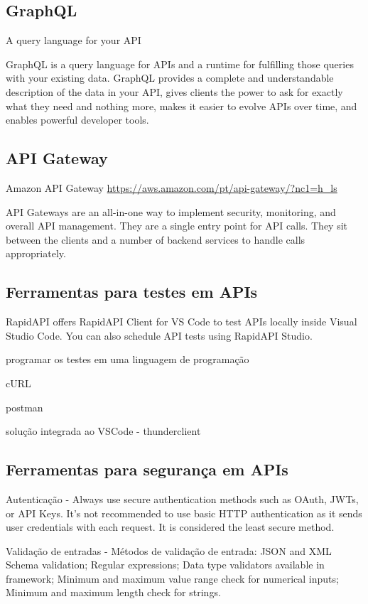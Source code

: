 \subsection{GraphQL}

A query language for your API

GraphQL is a query language for APIs and a runtime for fulfilling those queries with your existing data. GraphQL provides a complete and understandable description of the data in your API, gives clients the power to ask for exactly what they need and nothing more, makes it easier to evolve APIs over time, and enables powerful developer tools. \cite{GraphQL-site}

\subsection{API Gateway}

Amazon API Gateway \url{https://aws.amazon.com/pt/api-gateway/?nc1=h_ls}

API Gateways are an all-in-one way to implement security, monitoring, and overall API management. They are a single entry point for API calls. They sit between the clients and a number of backend services to handle calls appropriately.

\subsection{Ferramentas para testes em APIs}\label{ferramentas-testes-apis}

RapidAPI offers RapidAPI Client for VS Code to test APIs locally inside Visual Studio Code. You can also schedule API tests using RapidAPI Studio.

programar os testes em uma linguagem de programação

cURL

postman

solução integrada ao VSCode - thunderclient

\subsection{Ferramentas para segurança em APIs}

Autenticação - Always use secure authentication methods such as OAuth, JWTs, or API Keys. It's not recommended to use basic HTTP authentication as it sends user credentials with each request. It is considered the least secure method.

Validação de entradas - Métodos de validação de entrada: JSON and XML Schema validation; Regular expressions;  Data type validators available in framework; Minimum and maximum value range check for numerical inputs;  Minimum and maximum length check for strings.

